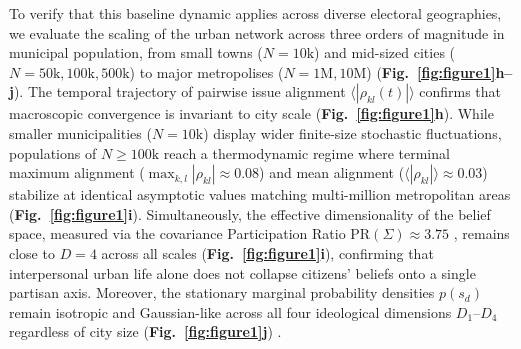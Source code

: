 \documentclass{article}
\begin{document}
To verify that this baseline dynamic applies across diverse electoral geographies, we evaluate the scaling of the urban network across three orders of magnitude in municipal population, from small towns ($N = 10\mathrm{k}$) and mid-sized cities ($N = 50\mathrm{k}, 100\mathrm{k}, 500\mathrm{k}$) to major metropolises ($N = 1\mathrm{M}, 10\mathrm{M}$) \citep{bettencourt2007growth, schlapfer2014scaling} (\textbf{Fig.~\ref{fig:figure1}h--j}). The temporal trajectory of pairwise issue alignment $\langle |\rho_{kl}(t)| \rangle$ confirms that macroscopic convergence is invariant to city scale (\textbf{Fig.~\ref{fig:figure1}h}). While smaller municipalities ($N = 10\mathrm{k}$) display wider finite-size stochastic fluctuations, populations of $N \ge 100\mathrm{k}$ reach a thermodynamic regime \citep{castellano2009statistical} where terminal maximum alignment ($\max_{k,l} |\rho_{kl}| \approx 0.08$) and mean alignment ($\langle |\rho_{kl}| \rangle \approx 0.03$) stabilize at identical asymptotic values matching multi-million metropolitan areas \citep{baldassarri2008partisans} (\textbf{Fig.~\ref{fig:figure1}i}). Simultaneously, the effective dimensionality of the belief space, measured via the covariance Participation Ratio $\mathrm{PR}(\Sigma) \approx 3.75$ \citep{roy1953useful}, remains close to $D=4$ across all scales (\textbf{Fig.~\ref{fig:figure1}i}), confirming that interpersonal urban life alone does not collapse citizens' beliefs onto a single partisan axis. Moreover, the stationary marginal probability densities $p(s_d)$ remain isotropic and Gaussian-like across all four ideological dimensions $D_1$--$D_4$ regardless of city size (\textbf{Fig.~\ref{fig:figure1}j}) \citep{scott2015multivariate}.
\end{document}
